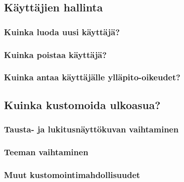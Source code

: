 \documentclass[a4paper, 12pt, finnish]{article}
\begin{document}
\subsection{Käyttäjien hallinta}

\subsubsection{Kuinka luoda uusi käyttäjä?}

\subsubsection{Kuinka poistaa käyttäjä?}

\subsubsection{Kuinka antaa käyttäjälle ylläpito-oikeudet?}

\subsection{Kuinka kustomoida ulkoasua?}

\subsubsection{Tausta- ja lukitusnäyttökuvan vaihtaminen}

\subsubsection{Teeman vaihtaminen}

\subsubsection{Muut kustomointimahdollisuudet}
\end{document}
